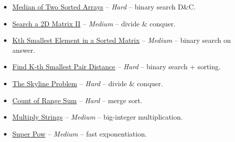 \documentclass[11pt]{article}
\begin{document}
\begin{itemize}
  \item \href{https://leetcode.com/problems/median-of-two-sorted-arrays/}{Median of Two Sorted Arrays} -- \emph{Hard} -- binary search D\&C.
  \item \href{https://leetcode.com/problems/search-a-2d-matrix-ii/}{Search a 2D Matrix II} -- \emph{Medium} -- divide \& conquer.
  \item \href{https://leetcode.com/problems/kth-smallest-element-in-a-sorted-matrix/}{Kth Smallest Element in a Sorted Matrix} -- \emph{Medium} -- binary search on answer.
  \item \href{https://leetcode.com/problems/find-k-th-smallest-pair-distance/}{Find K-th Smallest Pair Distance} -- \emph{Hard} -- binary search + sorting.
  \item \href{https://leetcode.com/problems/the-skyline-problem/}{The Skyline Problem} -- \emph{Hard} -- divide \& conquer.
  \item \href{https://leetcode.com/problems/count-of-range-sum/}{Count of Range Sum} -- \emph{Hard} -- merge sort.
  \item \href{https://leetcode.com/problems/multiply-strings/}{Multiply Strings} -- \emph{Medium} -- big-integer multiplication.
  \item \href{https://leetcode.com/problems/super-pow/}{Super Pow} -- \emph{Medium} -- fast exponentiation.
\end{itemize}
\end{document}
